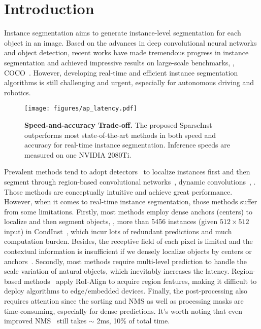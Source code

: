 \documentclass[10pt,twocolumn,letterpaper]{article}
\begin{document}
\section{Introduction}
\let\thefootnote\relax{}

Instance segmentation aims to generate instance-level segmentation for each object in an image. Based on the advances in deep convolutional neural networks and object detection, recent works \cite{MaskRCNNHeGDG17,MSRCNNHuangHGHW19,HTCChenPWXLSF0SOLL19,BMaskChengWH020,SOLOWangKSJL20} have made tremendous progress in instance segmentation and achieved impressive results on large-scale benchmarks, \eg, COCO~\cite{COCOLinMBHPRDZ14}. However, developing real-time and efficient instance segmentation algorithms is still challenging and urgent, especially for autonomous driving and robotics.

\begin{figure}
\centering
\texttt{[image: figures/ap\_latency.pdf]}
\caption{\textbf{Speed-and-accuracy Trade-off.} The proposed SparseInst outperforms most state-of-the-art methods in both speed and accuracy for real-time instance segmentation. Inference speeds are measured on one NVIDIA 2080Ti.}
\label{fig:ap_latency}
\vspace{-16pt}
\end{figure}

Prevalent methods tend to adopt detectors~\cite{FRCNNRenHG017,FCOSTianSCH19} to localize instances first and then segment through region-based convolutional networks~\cite{MaskRCNNHeGDG17}, dynamic convolutions~\cite{TianSC20}, \etc.
Those methods are conceptually intuitive and achieve great performance.
However, when it comes to real-time instance segmentation, those methods suffer from some limitations.
Firstly, most methods employ dense anchors (centers) to localize and then segment objects, \eg, more than 5456 instances (given $512\times512$ input) in CondInst~\cite{TianSC20}, which incur lots of redundant predictions and much computation burden.
Besides, the receptive field of each pixel is limited and the contextual information is insufficient if we densely localize objects by centers or anchors~\cite{yolofabs-2103-09460,DensePointsYangXXZUWLH20}.
Secondly, most methods require multi-level prediction to handle the scale variation of natural objects, which inevitably increases the latency.
Region-based methods~\cite{MaskRCNNHeGDG17} apply RoI-Align to acquire region features, making it difficult to deploy algorithms to edge/embedded devices.
Finally, the post-processing also requires attention since the sorting and NMS as well as processing masks are time-consuming, especially for dense predictions. It's worth noting that even improved NMS~\cite{YolactBolyaZXL19,SOLOV2WangZKLS20} still takes $\sim$ 2ms, 10\% of total time.
\end{document}
